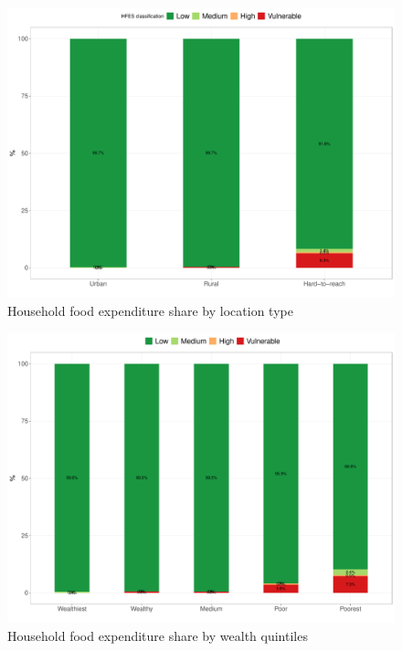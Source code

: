 \documentclass[12pt,a4paper]{article}
\begin{document}
\begin{figure}[H]

{\centering \includegraphics{kayahReport_files/figure-latex/hfes1plot-1} 

}

\caption{Household food expenditure share by location type}\label{fig:hfes1plot}
\end{figure}

\begin{figure}[H]

{\centering \includegraphics{kayahReport_files/figure-latex/hfes2plot-1} 

}

\caption{Household food expenditure share by wealth quintiles}\label{fig:hfes2plot}
\end{figure}
\end{document}
